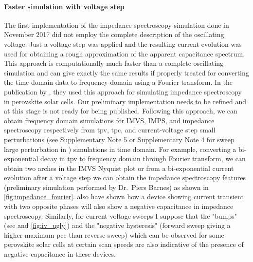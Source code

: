 \paragraph{Faster simulation with voltage step}\label{impedance_fourier}
The first implementation of the impedance spectroscopy simulation done in November 2017 did not employ the complete description of the oscillating voltage.
Just a voltage step was applied and the resulting current evolution was used for obtaining a rough approximation of the apparent capacitance spectrum.
This approach is computationally much faster than a complete oscillating simulation and can give exactly the same results if properly treated for converting the time\hyp{}domain data to frequency\hyp{}domain using a Fourier transform.
In the publication by , they used this approach for simulating impedance spectroscopy in perovskite solar cells.
Our preliminary implementation needs to be refined and at this stage is not ready for being published.
Following this approach, we can obtain frequency domain simulations for IMVS, IMPS, and impedance spectroscopy respectively from \gls{tpv}, \gls{tpc}, and current\hyp{}voltage step small perturbations (see Supplementary Note 5 or Supplementary Note 4 for sweep large perturbation in ) simulations in time domain.
For example, converting a bi\hyp{}exponential decay in \gls{tpv} to frequency domain through Fourier transform, we can obtain two arches in the IMVS Nyquist plot or from a bi\hyp{}exponential current evolution after a voltage step we can obtain the impedance spectroscopy features (preliminary simulation performed by Dr.\ Piers Barnes) as shown in \cref{fig:impedance_fourier}.
 also have shown how a device showing current transient with two opposite phases will also show a negative capacitance in impedance spectroscopy.
Similarly, for current\hyp{}voltage sweeps I suppose that the "bumps" (see  and \cref{fig:iv_ugly}) and the "negative hysteresis" (forward sweep giving a higher maximum \gls{pce} than reverse sweep) which can be observed for some perovskite solar cells at certain scan speeds are also indicative of the presence of negative capacitance in these devices.

